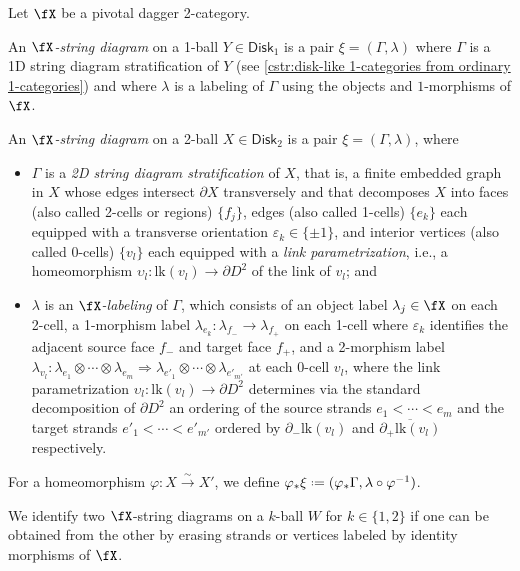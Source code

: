 \documentclass[12pt,reqno]{amsart}
\newcommand{\Disk}{\mathsf{Disk}}
\newcommand{\orev}{\overline}
\newcommand{\defn}[1]{\emph{#1}}
\DeclareRobustCommand{\coloneq}{\mathrel{\vcenter{\baselineskip0.5ex\lineskiplimit0pt\hbox{\scriptsize{\upshape.}}\hbox{\scriptsize{\upshape.}}}}=}
\begin{document}
\begin{definition}
Let $\fX$ be a pivotal dagger 2-category.
\begin{lst} 
\item An \defn{$\fX$-string diagram} on a 1-ball $Y\in\Disk_1$ is a pair $\xi=(\Gamma,\lambda)$ where $\Gamma$ is a 1D string diagram stratification of $Y$ (see \cref{cstr:disk-like 1-categories from ordinary 1-categories}) and where $\lambda$ is a labeling of $\Gamma$ using the objects and $1$-morphisms of $\fX$.

\item An \defn{$\fX$-string diagram} on a 2-ball $X\in\Disk_2$ is a pair $\xi = (\Gamma,\lambda)$, where
\begin{itemize} 
\item $\Gamma$ is a \defn{2D string diagram stratification} of $X$, that is, a finite embedded graph in $X$ whose edges intersect $\partial X$ transversely and that decomposes $X$ into faces (also called 2-cells or regions) $\{f_j\}$, edges (also called 1-cells) $\{e_k\}$ each equipped with a transverse orientation $\varepsilon_k\in\{\pm1\}$, and interior vertices (also called 0-cells) $\{v_l\}$ each equipped with a \defn{link parametrization}, i.e., a homeomorphism $\upsilon_l \colon \mathrm{lk}(v_l)\to\partial D^2$ of the link of $v_l$; and 
\item $\lambda$ is an \defn{$\fX$-labeling} of $\Gamma$, which consists of an object label $\lambda_j \in \fX$ on each 2-cell, a 1-morphism label $\lambda_{e_k} \colon \lambda_{f_-} \to \lambda_{f_+}$ on each 1-cell where $\varepsilon_k$ identifies the adjacent source face $f_-$ and target face $f_+$, and a 2-morphism label $\lambda_{v_l} \colon \lambda_{e_1} \otimes \cdots \otimes \lambda_{e_m} \Rightarrow \lambda_{e'_1} \otimes \cdots \otimes \lambda_{e'_{m'}}$ at each 0-cell $v_l$, where the link parametrization $\upsilon_l\colon \mathrm{lk}(v_l)\to \partial D^2$ determines via the standard decomposition of $\partial D^2$ an ordering of the source strands $e_1<\cdots<e_m$ and the target strands $e'_1<\cdots<e'_{m'}$ ordered by $\partial_-\mathrm{lk}(v_l)$ and $\orev{\partial_+\mathrm{lk}(v_l)}$ respectively.
\end{itemize}
For a homeomorphism $\varphi\colon X\xrightarrow{\sim} X'$, we define $\varphi_*\xi\coloneq(\varphi_*\Gamma,\lambda\circ \varphi^{-1})$.
\end{lst}
We identify two $\fX$-string diagrams on a $k$-ball $W$ for $k\in\{1,2\}$ if one can be obtained from the other by erasing strands or vertices labeled by identity morphisms of $\fX$.
\end{definition}
\end{document}
